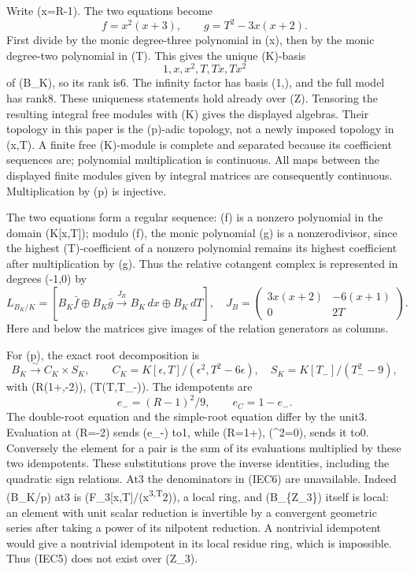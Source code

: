 \documentclass[
  10pt,
]{article}
\begin{document}
Write (x=R-1). The two equations become \[
f=x^2(x+3),\qquad g=T^2-3x(x+2).
\tag{IEC2}
\] First divide by the monic degree-three polynomial in (x), then by the
monic degree-two polynomial in (T). This gives the unique (K)-basis \[
1,x,x^2,T,Tx,Tx^2
\tag{IEC3}
\] of (B\_K), so its rank is6. The infinity factor has basis (1,\Theta),
and the full model has rank8. These uniqueness statements hold already
over (\mathbb Z). Tensoring the resulting integral free modules with (K)
gives the displayed algebras. Their topology in this paper is the
(p)-adic topology, not a newly imposed topology in (x,T). A finite free
(K)-module is complete and separated because its coefficient sequences
are; polynomial multiplication is continuous. All maps between the
displayed finite modules given by integral matrices are consequently
continuous. Multiplication by (p) is injective.

The two equations form a regular sequence: (f) is a nonzero polynomial
in the domain (K{[}x,T{]}); modulo (f), the monic polynomial (g) is a
nonzerodivisor, since the highest (T)-coefficient of a nonzero
polynomial remains its highest coefficient after multiplication by (g).
Thus the relative cotangent complex is represented in degrees (-1,0) by
\[
L_{B_K/K}=\left[B_K\bar f\oplus B_K\bar g
\xrightarrow{J_B}B_K\,dx\oplus B_K\,dT\right],\quad
J_B=\begin{pmatrix}3x(x+2)&-6(x+1)\\0&2T\end{pmatrix}.
\tag{IEC4}
\] Here and below the matrices give images of the relation generators as
columns.

For (p), the exact root decomposition is \[
B_K\xrightarrow{\sim} C_K\times S_K,\qquad
C_K=K[\epsilon,T]/(\epsilon^2,T^2-6\epsilon),\quad
S_K=K[T_-]/(T_-^2-9),
\tag{IEC5}
\] with (R\mapsto(1+\epsilon,-2)), (T\mapsto(T,T\_-)). The idempotents
are \[
e_-=(R-1)^2/9,\qquad e_C=1-e_-.
\tag{IEC6}
\] The double-root equation and the simple-root equation differ by the
unit3. Evaluation at (R=-2) sends (e\_-) to1, while (R=1+\epsilon),
(\epsilon\^{}2=0), sends it to0. Conversely the element for a pair is
the sum of its evaluations multiplied by these two idempotents. These
substitutions prove the inverse identities, including the quadratic sign
relations. At3 the denominators in (IEC6) are unavailable. Indeed
(B\_K/p) at3 is (\mathbb F\_3{[}x,T{]}/(x\textsuperscript{3,T}2)), a
local ring, and (B\_\{\mathbb Z\_3\}) itself is local: an element with
unit scalar reduction is invertible by a convergent geometric series
after taking a power of its nilpotent reduction. A nontrivial idempotent
would give a nontrivial idempotent in its local residue ring, which is
impossible. Thus (IEC5) does not exist over (\mathbb Z\_3).
\end{document}
